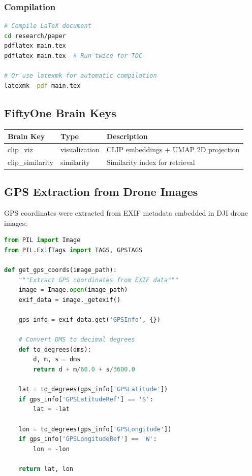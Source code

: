 \subsubsection{Compilation}

\begin{lstlisting}[language=bash]
# Compile LaTeX document
cd research/paper
pdflatex main.tex
pdflatex main.tex  # Run twice for TOC

# Or use latexmk for automatic compilation
latexmk -pdf main.tex
\end{lstlisting}

\subsection{FiftyOne Brain Keys}

\begin{table}[H]
\centering
\begin{tabular}{lll}
\toprule
\textbf{Brain Key} & \textbf{Type} & \textbf{Description} \\
\midrule
clip\_viz & visualization & CLIP embeddings + UMAP 2D projection \\
clip\_similarity & similarity & Similarity index for retrieval \\
\bottomrule
\end{tabular}
\end{table}

\subsection{GPS Extraction from Drone Images}

GPS coordinates were extracted from EXIF metadata embedded in DJI drone images:

\begin{lstlisting}[language=Python]
from PIL import Image
from PIL.ExifTags import TAGS, GPSTAGS

def get_gps_coords(image_path):
    """Extract GPS coordinates from EXIF data"""
    image = Image.open(image_path)
    exif_data = image._getexif()

    gps_info = exif_data.get('GPSInfo', {})

    # Convert DMS to decimal degrees
    def to_degrees(dms):
        d, m, s = dms
        return d + m/60.0 + s/3600.0

    lat = to_degrees(gps_info['GPSLatitude'])
    if gps_info['GPSLatitudeRef'] == 'S':
        lat = -lat

    lon = to_degrees(gps_info['GPSLongitude'])
    if gps_info['GPSLongitudeRef'] == 'W':
        lon = -lon

    return lat, lon
\end{lstlisting}

